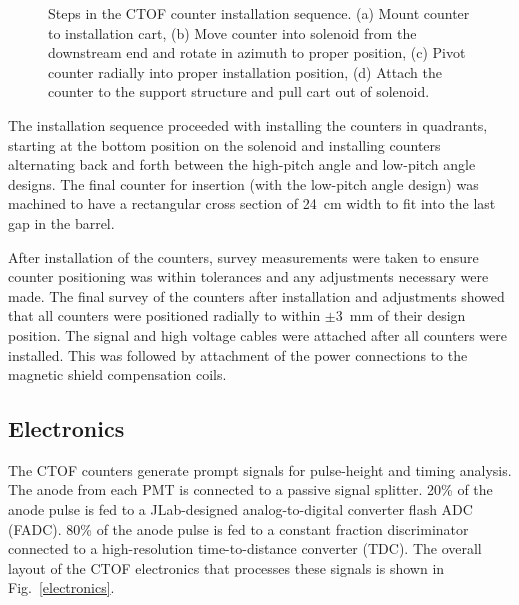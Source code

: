\documentclass{elsart}
\begin{document}
\begin{figure}[htbp]
\begin{picture}
\end{picture} 
\caption{Steps in the CTOF counter installation sequence. (a) Mount counter to installation cart, (b) Move
counter into solenoid from the downstream end and rotate in azimuth to proper position, (c) Pivot counter
radially into proper installation position, (d) Attach the counter to the support structure and pull cart out of
solenoid.}
\label{install}
\end{figure}

The installation sequence proceeded with installing the counters in quadrants, starting at the bottom
position on the solenoid and installing counters alternating back and forth between the high-pitch
angle and low-pitch angle designs. The final counter for insertion (with the low-pitch angle design) was
machined to have a rectangular cross section of 24~cm width to fit into the last gap in the barrel.

After installation of the counters, survey measurements were taken to ensure counter positioning 
was within tolerances and any adjustments necessary were made. The final survey of the counters
after installation and adjustments showed that all counters were positioned radially to within
$\pm$3~mm of their design position. The signal and high voltage cables were attached after all
counters were installed. This was followed by attachment of the power connections to the magnetic
shield compensation coils.

\subsection{Electronics}
\label{sec-elec}

The CTOF counters generate prompt signals for pulse-height and timing analysis. The anode from 
each PMT is connected to a passive signal splitter. 20\% of the anode pulse is fed to a JLab-designed
analog-to-digital converter flash ADC (FADC). 80\% of the anode pulse is fed to a constant fraction
discriminator connected to a high-resolution time-to-distance converter (TDC). The overall layout of
the CTOF electronics that processes these signals is shown in Fig.~\ref{electronics}.
\end{document}
